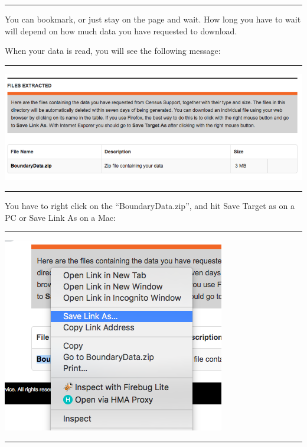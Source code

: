 \documentclass[
]{book}
\begin{document}
\begin{center}\rule{0.5\linewidth}{0.5pt}\end{center}

You can bookmark, or just stay on the page and wait. How long you have to wait will depend on how much data you have requested to download.

When your data is read, you will see the following message:

\begin{center}\rule{0.5\linewidth}{0.5pt}\end{center}

\includegraphics{img/download.png}

\begin{center}\rule{0.5\linewidth}{0.5pt}\end{center}

You have to right click on the ``BoundaryData.zip'', and hit Save Target as on a PC or Save Link As on a Mac:

\begin{center}\rule{0.5\linewidth}{0.5pt}\end{center}

\includegraphics{img/save_link_as.png}

\begin{center}\rule{0.5\linewidth}{0.5pt}\end{center}
\end{document}
